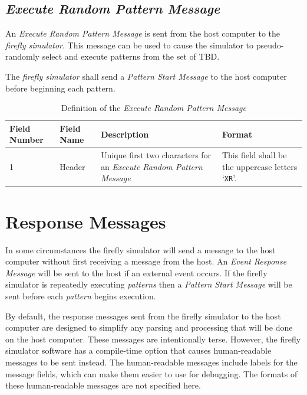 \documentclass[letterpaper,11pt]{article}
\begin{document}
\subsection{\textit{Execute Random Pattern Message}}

An \textit{Execute Random Pattern Message} is sent from the host computer to the
\textit{firefly simulator}. This message can be used to cause the simulator to
pseudo-randomly select and execute patterns from the set of TBD.

The \textit{firefly simulator} shall send a \textit{Pattern Start Message}
to the host computer before beginning each pattern.

\begin{table}[H]
  \caption{Definition of the \textit{Execute Random Pattern Message}}
  \centering
  \setlength\extrarowheight{2pt}
  \begin{tabular}[h]{|p{0.5in}|p{1.00in}|p{2.25in}|p{2.25in}|} \hline
    Field Number & Field Name & Description & Format \\ \hline
    1            & Header
                 & Unique first two characters for an \textit{Execute Random
                 Pattern Message}
                 & This field shall be the uppercase letters `\texttt{XR}'.
                 \\ \hline
  \end{tabular}
  \label{tab:ExecuteRandom}
\end{table}

\section{Response Messages}

In some circumstances the firefly simulator will send a message to the host
computer without first receiving a message from the host. An \textit{Event
Response Message} will be sent to the host if an external event occurs. If the
firefly simulator is repeatedly executing \textit{patterns} then a
\textit{Pattern Start Message} will be sent before each \textit{pattern} begins execution.

By default, the response messages sent from the firefly simulator to the host
computer are designed to simplify any parsing and processing that will be done
on the host computer. These messages are intentionally terse. However, the
firefly simulator software has a compile-time option that causes human-readable
messages to be sent instead. The human-readable messages include labels for
the message fields, which can make them easier to use for debugging. The
formats of these human-readable messages are not specified here.
\end{document}
